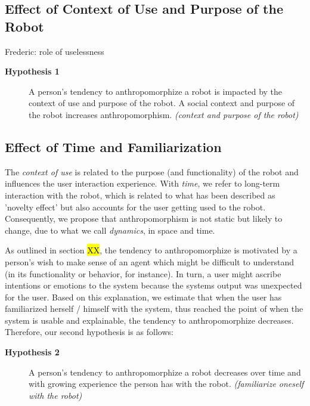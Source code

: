 \documentclass[twocolumn]{svjour3}          %
\begin{document}
\subsection{Effect of Context of Use and Purpose of the Robot}
\label{sec:8.1}
Frederic: role of uselessness


\begin{description}
	\item[\textbf{Hypothesis 1}] A person's tendency to anthropomorphize a robot is impacted by the context of use and purpose of the robot. A social context and purpose of the robot increases anthropomorphism. \textit{(context and purpose of the robot)}
\end{description}



\subsection{Effect of Time and Familiarization}
\label{sec:8.2}

	The \textit{context of use} is related to the purpose (and functionality) of the robot and influences the user interaction experience. With \textit{time}, we refer to long-term interaction with the robot, which is related to what has been described as 'novelty effect' but also accounts for the user getting used to the robot. Consequently, we propose that anthropomorphism is not static but likely to change, due to what we call \textit{dynamics}, in space and time.


	As outlined in section \hl{XX}, the tendency to anthropomorphize is motivated by a person's wish to make sense of an agent which might be difficult to understand (in its functionality or behavior, for instance). In turn, a user might ascribe intentions or emotions to the system because the systems output was unexpected for the user. Based on this explanation, we estimate that when the user has familiarized herself / himself with the system, thus reached the point of when the system is usable and explainable, the tendency to anthropomorphize decreases. Therefore, our second hypothesis is as follows: 

\begin{description}
	\item[\textbf{Hypothesis 2}] A person's tendency to anthropomorphize a robot decreases over time and with growing experience the person has with the robot. \textit{(familiarize oneself with the robot)}
\end{description}	
	
\end{document}
